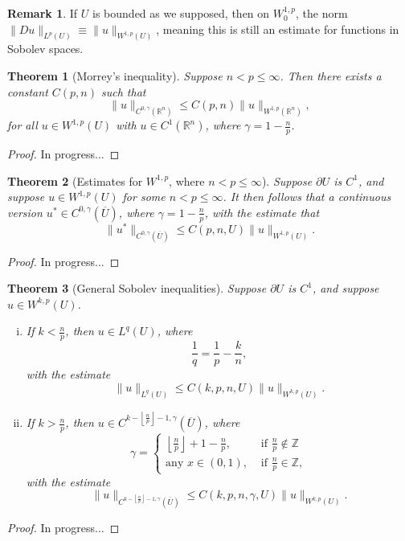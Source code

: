 \documentclass[11pt]{article}
\newtheorem{theorem}{Theorem}
\theoremstyle{definition}
\newtheorem*{remark}{Remark}
\begin{document}
\begin{remark}
	If $U$ is bounded as we supposed, then on $W_{0}^{1,p}$, the norm $\|Du\|_{L^{p}(U)} \equiv \|u\|_{W^{1,p}(U)}$,
	meaning this is still an estimate for functions in Sobolev spaces.
\end{remark}

\begin{theorem}[Morrey's inequality]
Suppose $n < p \leq \infty$. Then there exists a constant $C(p,n)$ such that
	\[\|u\|_{C^{0,\gamma}(\mathbb{R}^n)} \leq C(p,n)\|u\|_{W^{1,p}(\mathbb{R}^n)},\]
for all $u \in W^{1,p}(U)$ with $u \in C^1(\mathbb{R}^n)$, where $\gamma = 1 - \frac{n}{p}$.
\end{theorem}
\begin{proof}
In progress...
\end{proof}

\begin{theorem}[Estimates for $W^{1,p}$, where $n < p \leq \infty$]
Suppose $\partial U$ is $C^1$,
	and suppose $u \in W^{1,p}(U)$ for some $n < p \leq \infty$. It then follows that a continuous version $u^* \in C^{0,\gamma}(\overline{U})$,
where $\gamma = 1 - \frac{n}{p}$, with the estimate that
	\[\|u^*\|_{C^{0,\gamma}(\overline{U})} \leq C(p,n,U)\|u\|_{W^{1,p}(U)}.\]
\end{theorem}
\begin{proof}
In progress...
\end{proof}

\begin{theorem}[General Sobolev inequalities]
	Suppose $\partial U$ is $C^1$, and suppose $u \in W^{k,p}(U)$.
	\begin{enumerate}[(i)]
		\item If $k < \frac{n}{p}$, then $u \in L^q(U)$, where
			\begin{equation*}
				\frac{1}{q} = \frac{1}{p} - \frac{k}{n},
			\end{equation*}
			with the estimate
			\begin{equation*}
				\|u\|_{L^q(U)} \leq C(k,p,n,U)\|u\|_{W^{k,p}(U)}.
			\end{equation*}
		\item If $k > \frac{n}{p}$, then $u \in C^{k-\left\lfloor\frac{n}{p}\right\rfloor-1, \gamma}(\overline{U})$, where
			\begin{equation*}
				\gamma =
				\begin{cases}
					\left\lfloor \frac{n}{p} \right\rfloor + 1 - \frac{n}{p}, &\text{ if } \frac{n}{p} \not\in \mathbb{Z} \\
					\text{any } x\in (0,1), &\text{ if } \frac{n}{p} \in \mathbb{Z},
				\end{cases}
			\end{equation*}
			with the estimate
			\begin{equation*}
				\|u\|_{C^{k-\left\lfloor\frac{n}{p}\right\rfloor-1, \gamma}(\overline{U})} \leq C(k,p,n,\gamma,U)\|u\|_{W^{k,p}(U)}.
			\end{equation*}
	\end{enumerate}
\end{theorem}
\begin{proof}
In progress...
\end{proof}
\end{document}
